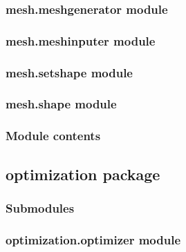 \documentclass[letterpaper,10pt,english]{sphinxmanual}
\begin{document}
\subsubsection{mesh.meshgenerator module}
\label{\detokenize{mesh:mesh-meshgenerator-module}}

\subsubsection{mesh.meshinputer module}
\label{\detokenize{mesh:mesh-meshinputer-module}}

\subsubsection{mesh.setshape module}
\label{\detokenize{mesh:mesh-setshape-module}}

\subsubsection{mesh.shape module}
\label{\detokenize{mesh:mesh-shape-module}}

\subsubsection{Module contents}
\label{\detokenize{mesh:module-mesh}}\label{\detokenize{mesh:module-contents}}

\subsection{optimization package}
\label{\detokenize{optimization:optimization-package}}\label{\detokenize{optimization::doc}}

\subsubsection{Submodules}
\label{\detokenize{optimization:submodules}}

\subsubsection{optimization.optimizer module}
\label{\detokenize{optimization:module-optimization.optimizer}}\label{\detokenize{optimization:optimization-optimizer-module}}
\end{document}
